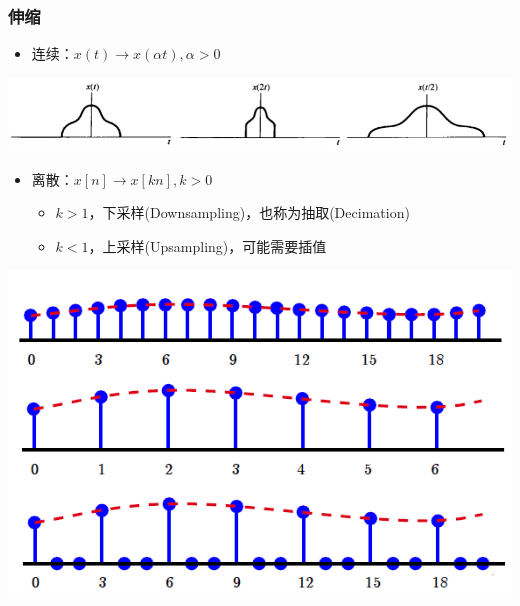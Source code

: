 \documentclass[CJKutf8,dvipsnames,table]{beamer}
\begin{document}
\begin{CJK*}{UTF8}{song}
  \begin{frame}
    \frametitle{伸缩}
    \begin{itemize}
    \item 连续：$x(t) \rightarrow x(\alpha t), \alpha > 0$
    \end{itemize}
    \begin{center}
      \includegraphics[scale=.4]{cscale}
    \end{center}
    \begin{itemize}
    \item 离散：$x[n] \rightarrow x[kn], k > 0$    
        \begin{itemize}
        \item $k>1$，下采样(Downsampling)，也称为抽取(Decimation)
        \item $k<1$，上采样(Upsampling)，可能需要插值
        \end{itemize}   
    \end{itemize} 
    \begin{center}
      \includegraphics[scale=.28]{dscale}
    \end{center}    
  \end{frame}  


\end{CJK*}
\end{document}
